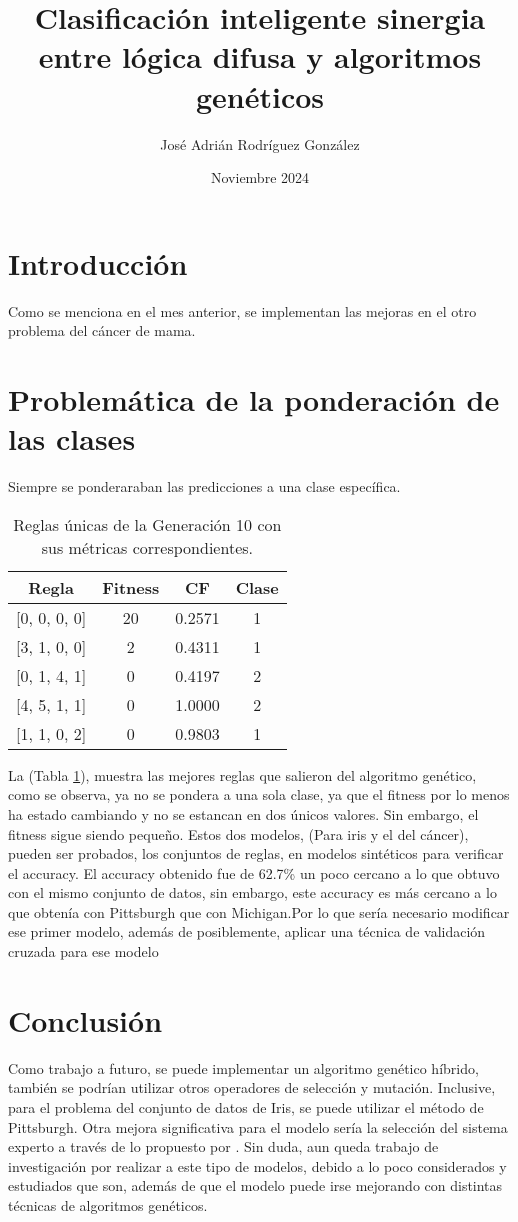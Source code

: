 \documentclass{article}
\title{Clasificación inteligente sinergia entre lógica difusa y algoritmos genéticos }
\author{José Adrián Rodríguez González}
\date{Noviembre 2024}
\begin{document}
\maketitle
\section{Introducción}
Como se menciona en el mes anterior, se implementan las mejoras en el otro problema del cáncer de mama.
\section{Problemática de la ponderación de las clases}
Siempre se ponderaraban las predicciones a una clase específica.

\begin{table}[h!]
    \centering
    \begin{tabular}{@{}cccc@{}}
    \toprule
    \textbf{Regla}       & \textbf{Fitness} & \textbf{CF}    & \textbf{Clase} \\ \midrule
{[0, 0, 0, 0]}    & 20      & 0.2571  & 1     \\
{[3, 1, 0, 0]}    & 2       & 0.4311  & 1     \\
{[0, 1, 4, 1]}    & 0       & 0.4197  & 2     \\
{[4, 5, 1, 1]}    & 0       & 1.0000  & 2     \\
{[1, 1, 0, 2]}    & 0       & 0.9803  & 1     \\
\bottomrule
\end{tabular}
    \caption{Reglas únicas de la Generación 10 con sus métricas correspondientes.}
\label{tab:reglas-unicas}
\end{table}
    La (Tabla \ref{tab:reglas-unicas}), muestra las mejores reglas que salieron del algoritmo genético, como se observa, ya no se pondera a una sola clase, ya que el fitness por lo menos ha estado cambiando y no se estancan en dos únicos valores. Sin embargo, el fitness sigue siendo pequeño.
Estos dos modelos, (Para iris y el del cáncer), pueden ser probados, los conjuntos de reglas, en modelos sintéticos para verificar el accuracy.
El accuracy obtenido fue de 62.7\% un poco cercano a lo que obtuvo  con el mismo conjunto de datos, sin embargo, este accuracy es más cercano a lo que obtenía con Pittsburgh que con Michigan.Por lo que sería necesario modificar ese primer modelo, además de posiblemente, aplicar una técnica de validación cruzada para ese modelo 
\section{Conclusión}
Como trabajo a futuro, se puede implementar un algoritmo genético híbrido, también se podrían utilizar otros operadores de selección y mutación. Inclusive, para el problema del conjunto de datos de Iris, se puede utilizar el método de Pittsburgh. Otra mejora significativa para el modelo sería la selección del sistema experto a través de lo propuesto por \citep{inbook}. Sin duda, aun queda trabajo de investigación por realizar a este tipo de modelos, debido a lo poco considerados y estudiados que son, además de que el modelo puede irse mejorando con distintas técnicas de algoritmos genéticos.


\end{document}
